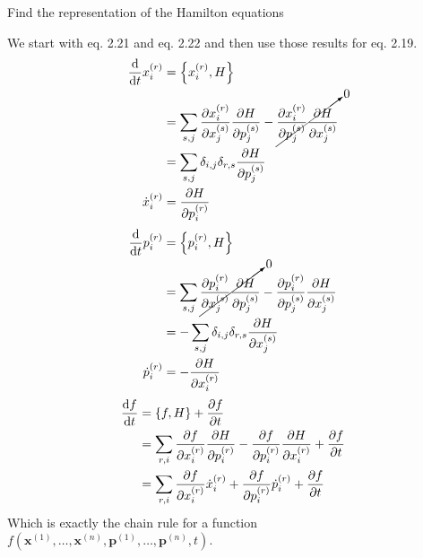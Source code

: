 \documentclass[boxes]{homework}
\makeatletter
\newcommand{\mmtm}[2]{p_#1^{(#2)}}
\newcommand{\pstn}[2]{x_#1^{(#2)}}
\numberwithin{@problem}{section}
\makeatother
\begin{document}
\begin{problem}
Find the representation of the Hamilton equations
\end{problem}

\begin{solution}
	We start with eq. 2.21 and eq. 2.22 and then use those results for eq. 2.19.
	\begin{align*}
		\dv{t}\pstn{i}{r} & = \pb{\pstn{i}{r}}{H}                                                                                                             \\
		                  & = \sum_{s,j}\pdv{\pstn{i}{r}}{\pstn{j}{s}}\pdv{H}{\mmtm{j}{s}} - \cancelto{0}{\pdv{\pstn{i}{r}}{\mmtm{j}{s}}\pdv{H}{\pstn{j}{s}}} \\
		                  & = \sum_{s,j}\delta_{i,j}\delta_{r,s}\pdv{H}{\mmtm{j}{s}}                                                                          \\
		\dot{x}_i^{(r)}   & = \pdv{H}{\mmtm{i}{r}}
	\end{align*}
	\begin{align*}
		\dv{t}\mmtm{i}{r} & = \pb{\mmtm{i}{r}}{H}                                                                                                             \\
		                  & = \sum_{s,j}\cancelto{0}{\pdv{\mmtm{i}{r}}{\pstn{j}{s}}\pdv{H}{\mmtm{j}{s}}} - \pdv{\mmtm{i}{r}}{\mmtm{j}{s}}\pdv{H}{\pstn{j}{s}} \\
		                  & = -\sum_{s,j}\delta_{i,j}\delta_{r,s}\pdv{H}{\pstn{j}{s}}                                                                         \\
		\dot{p}_i^{(r)}   & = -\pdv{H}{\pstn{i}{r}}
	\end{align*}
	\begin{align*}
		\dv{f}{t} & = \pb{f}{H} + \pdv{f}{t}                                                                                     \\
		          & = \sum_{r,i}\pdv{f}{\pstn{i}{r}}\pdv{H}{\mmtm{i}{r}} - \pdv{f}{\mmtm{i}{r}}\pdv{H}{\pstn{i}{r}} + \pdv{f}{t} \\
		          & = \sum_{r,i}\pdv{f}{\pstn{i}{r}}\dot{x}_i^{(r)} + \pdv{f}{\mmtm{i}{r}}\dot{p}_i^{(r)} + \pdv{f}{t}
	\end{align*}
	Which is exactly the chain rule for a function $f(\mathbf{x}^{(1)},\ldots,\mathbf{x}^{(n)}, \mathbf{p}^{(1)},\ldots,\mathbf{p}^{(n)}, t)$.

\end{solution}


\end{document}
